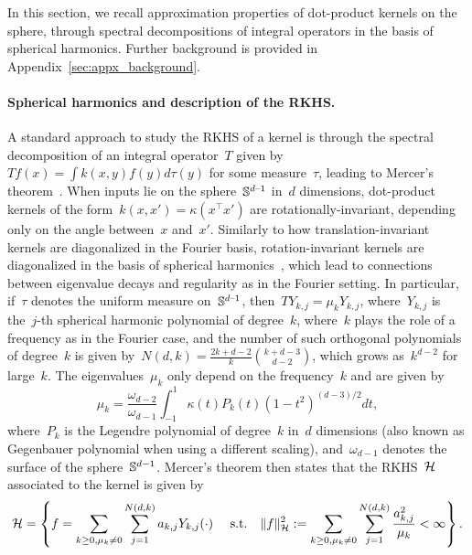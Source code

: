 In this section, we recall approximation properties of dot-product kernels on the sphere, through spectral decompositions of integral operators in the basis of spherical harmonics.
Further background is provided in Appendix~\ref{sec:appx_background}.

\paragraph{Spherical harmonics and description of the RKHS.}
A standard approach to study the RKHS of a kernel is through the spectral decomposition of an integral operator~$T$ given by~$Tf(x) = \int k(x, y) f(y) d \tau(y)$ for some measure~$\tau$, leading to Mercer's theorem~\citep[\eg,][]{cucker2002mathematical}.
When inputs lie on the sphere~${\mathbb S}^{{d\text{--}1}}$ in~$d$ dimensions, dot-product kernels of the form~$k(x, x') = \kappa(x^\top x')$ are rotationally-invariant, depending only on the angle between~$x$ and~$x'$.
Similarly to how translation-invariant kernels are diagonalized in the Fourier basis,
rotation-invariant kernels are diagonalized in the basis of spherical harmonics~\citep{smola2001regularization,bach2017breaking}, which lead to connections between eigenvalue decays and regularity as in the Fourier setting.
In particular, if~$\tau$ denotes the uniform measure on~${\mathbb S}^{{d\text{--}1}}$, then~$T Y_{k,j} = \mu_k Y_{k,j}$,
where~$Y_{k,j}$ is the~$j$-th spherical harmonic polynomial of degree~$k$, where~$k$ plays the role of a frequency as in the Fourier case, and the number of such orthogonal polynomials of degree~$k$ is given by~$N(d,k) = \frac{2k + d - 2}{k} {k + d - 3 \choose d - 2}$, which grows as~$k^{d-2}$ for large~$k$.
The eigenvalues~$\mu_k$ only depend on the frequency~$k$ and are given by
\begin{equation}
\label{eq:mu_k}
\mu_k = \frac{\omega_{d-2}}{\omega_{d-1}} \int_{-1}^1 \kappa(t) P_k(t) (1 - t^2)^{(d-3)/2} dt,
\end{equation}
where~$P_k$ is the Legendre polynomial of degree~$k$ in~$d$ dimensions (also known as Gegenbauer polynomial when using a different scaling), and~$\omega_{d-1}$ denotes the surface of the sphere~${\mathbb S}^{d-1}$.
Mercer's theorem then states that the RKHS~${\mathcal H}$ associated to the kernel is given by
\begin{equation}
\label{eq:rkhs_mercer}
{\mathcal H} = \left\{ f = \sum_{k\geq 0, \mu_k \ne 0} \sum_{j=1}^{N(d,k)} a_{k,j} Y_{k,j}(\cdot)
	\text{~~~~s.t.~~~} \|f\|_{\mathcal H}^2 := \sum_{k\geq 0, \mu_k \ne 0} \sum_{j=1}^{N(d,k)} \frac{a_{k,j}^2}{\mu_k} < \infty \right\}.
\end{equation}
